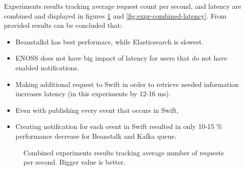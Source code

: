     Experiments results tracking average request count per second, and latency are combined and displayed in figures \ref{fig:expr-combined-reqs} and \ref{fig:expr-combined-latency}. From provided results can be concluded that:
    \begin{itemize}
        \item Beanstalkd has best performace, while Elasticsearch is slowest.
        \item ENOSS does not have big impact of latency for users that do not have enabled notifications.
        \item Making additional request to Swift in order to retrieve needed information increases latency (in this experiments by 12-16 ms).
        \item Even with publishing every event that occurs in Swift,
        \item Creating notification for each ovent in Swift resulted in only 10-15 \% performance decrease for Beanstalk and Kafka queue.
    \end{itemize}

    \begin{figure}[!htb]
        \caption{Combined experiments results tracking average number of requests per second. Bigger value is better.}
        \label{fig:expr-combined-reqs}
    \end{figure}


